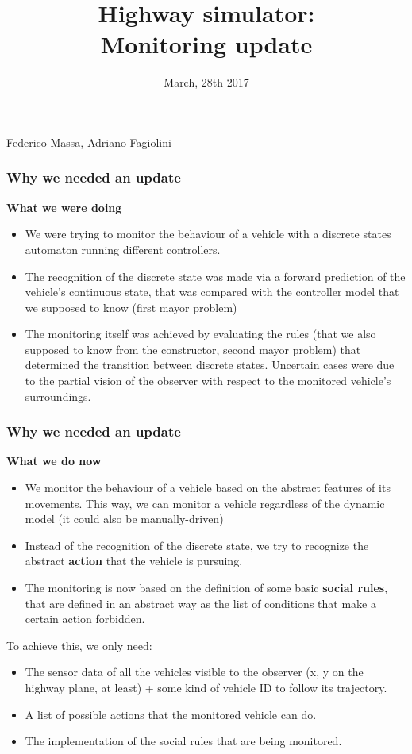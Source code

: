 \documentclass{beamer}
\title{Highway simulator: \\
Monitoring update}
\date{\small March, 28th 2017}
\begin{document}

{
\begin{frame}
\titlepage
\bigskip
\medskip
\centering\small Federico Massa, Adriano Fagiolini

\end{frame}}
\addtocounter{framenumber}{-1}

\begin{frame}
\frametitle{Why we needed an update}
\textbf{What we were doing}
\begin{itemize}
	\item We were trying to monitor the behaviour of a vehicle
		  with a discrete states automaton running different
		  controllers.
 	\item The recognition of the discrete state was made via 
 		  a forward prediction of the vehicle's continuous state,
 		  that was compared with the controller model that we
 		  supposed to know (first mayor problem)
  	\item The monitoring itself was achieved by evaluating the
  		  rules (that we also supposed to know from the constructor, second 
  		  mayor problem) that determined the transition between
  		  discrete states. Uncertain cases were due to the 
  		  partial vision of the observer with respect to the 
  		  monitored vehicle's surroundings.
\end{itemize}
\end{frame}

\begin{frame}
\frametitle{Why we needed an update}
\textbf{What we do now}
\begin{itemize}
	\item We monitor the behaviour of a vehicle based on the
		  abstract features of its movements. This way, we can
		  monitor a vehicle regardless of the dynamic model 
		  (it could also be manually-driven)
 	\item Instead of the recognition of the discrete state,
 		  we try to recognize the abstract \textbf{action} 
 		  that the vehicle is pursuing. 
  	\item The monitoring is now based on the definition
  		  of some basic \textbf{social rules}, that 
  		  are defined in an abstract way as the list of
  		  conditions that make a certain action forbidden.
\end{itemize}

To achieve this, we only need:
\begin{itemize}
\item The sensor data of all the vehicles visible to the observer (x, y 
      on the highway plane, at least) + some kind of vehicle ID to 
      follow its trajectory.
\item A list of possible actions that the monitored vehicle can do.
\item The implementation of the social rules that are being monitored.
\end{itemize}
\end{frame}
\end{document}
